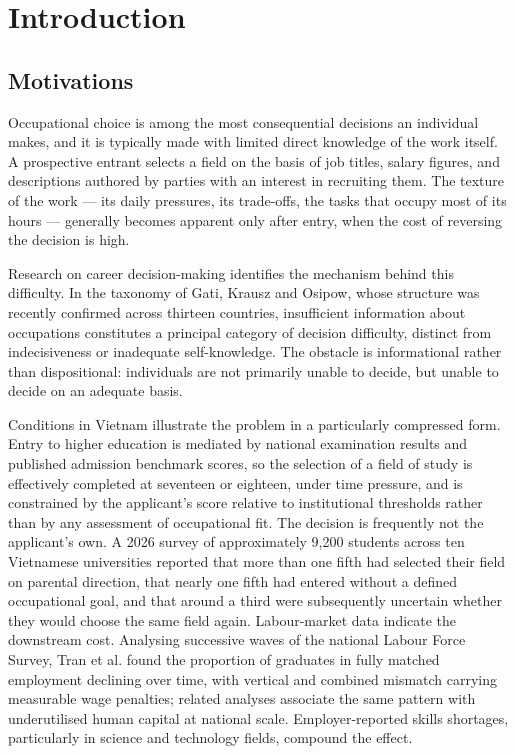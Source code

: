 \newpage
\section{Introduction}

\subsection{Motivations}

Occupational choice is among the most consequential decisions an individual makes, and it is typically made with limited direct knowledge of the work itself. A prospective entrant selects a field on the basis of job titles, salary figures, and descriptions authored by parties with an interest in recruiting them. The texture of the work --- its daily pressures, its trade-offs, the tasks that occupy most of its hours --- generally becomes apparent only after entry, when the cost of reversing the decision is high.

Research on career decision-making identifies the mechanism behind this difficulty. In the taxonomy of Gati, Krausz and Osipow\cite{r1}, whose structure was recently confirmed across thirteen countries\cite{r2}, insufficient information about occupations constitutes a principal category of decision difficulty, distinct from indecisiveness or inadequate self-knowledge. The obstacle is informational rather than dispositional: individuals are not primarily unable to decide, but unable to decide on an adequate basis.

Conditions in Vietnam illustrate the problem in a particularly compressed form. Entry to higher education is mediated by national examination results and published admission benchmark scores, so the selection of a field of study is effectively completed at seventeen or eighteen, under time pressure, and is constrained by the applicant's score relative to institutional thresholds rather than by any assessment of occupational fit\cite{r3}. The decision is frequently not the applicant's own. A 2026 survey of approximately 9,200 students across ten Vietnamese universities reported that more than one fifth had selected their field on parental direction, that nearly one fifth had entered without a defined occupational goal, and that around a third were subsequently uncertain whether they would choose the same field again\cite{r4}. Labour-market data indicate the downstream cost. Analysing successive waves of the national Labour Force Survey, Tran et al.\cite{r5} found the proportion of graduates in fully matched employment declining over time, with vertical and combined mismatch carrying measurable wage penalties; related analyses associate the same pattern with underutilised human capital at national scale. Employer-reported skills shortages, particularly in science and technology fields, compound the effect.

